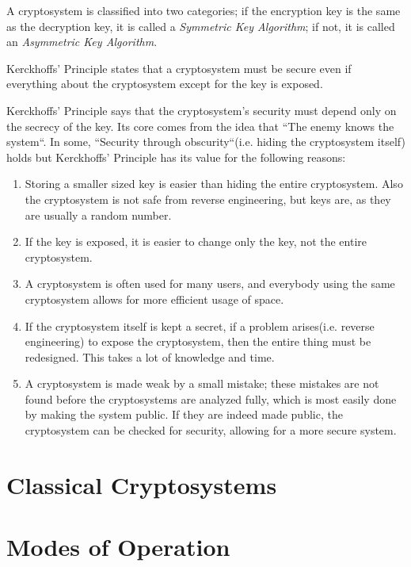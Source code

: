 \documentclass{report}
\begin{document}
		A cryptosystem is classified into two categories; if the encryption key is the same as the decryption key, it is called a \emph{Symmetric Key Algorithm}; if not, it is called an \emph{Asymmetric Key Algorithm}.
		
		\begin{defn}
			Kerckhoffs' Principle states that a cryptosystem must be secure even if everything about the cryptosystem except for the key is exposed.
		\end{defn}
		Kerckhoffs' Principle says that the cryptosystem's security must depend only on the secrecy of the key. Its core comes from the idea that ``The enemy knows the system``. In some, ``Security through obscurity``(i.e. hiding the cryptosystem itself) holds but Kerckhoffs' Principle has its value for the following reasons:
		\begin{enumerate}
			\item Storing a smaller sized key is easier than hiding the entire cryptosystem. Also the cryptosystem is not safe from reverse engineering, but keys are, as they are usually a random number.
			\item If the key is exposed, it is easier to change only the key, not the entire cryptosystem.
			\item A cryptosystem is often used for many users, and everybody using the same cryptosystem allows for more efficient usage of space.
			\item If the cryptosystem itself is kept a secret, if a problem arises(i.e. reverse engineering) to expose the cryptosystem, then the entire thing must be redesigned. This takes a lot of knowledge and time.
			\item A cryptosystem is made weak by a small mistake; these mistakes are not found before the cryptosystems are analyzed fully, which is most easily done by making the system public. If they are indeed made public, the cryptosystem can be checked for security, allowing for a more secure system.
		\end{enumerate}
		
	\section{Classical Cryptosystems}
		
		
	\section{Modes of Operation}
		
\end{document}
